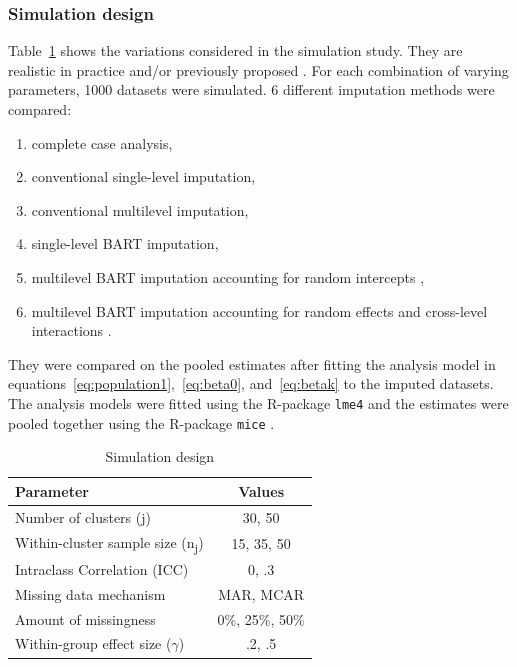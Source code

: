 \documentclass[10pt, a4paper, titlepage]{article}
\begin{document}
\subsubsection{Simulation design} 
Table~\ref{tab:simulationparameters} shows the variations considered in the simulation study. They are realistic in practice and/or previously proposed \citep{gulliford1999, murray2003, hox2017, grund2018, enders2018a, enders2020}. For each combination of varying parameters, 1000 datasets were simulated. 6 different imputation methods were compared: 
\begin{enumerate}
    \item complete case analysis,
    \item conventional single-level imputation,
    \item conventional multilevel imputation,
    \item single-level BART imputation,
    \item multilevel BART imputation accounting for random intercepts \citep{chen2020, wagner2020, tan2016, wundervald2022},
    \item multilevel BART imputation accounting for random effects and cross-level interactions \citep{dorie2022}.
\end{enumerate} They were compared on the pooled estimates after fitting the analysis model in equations~\ref{eq:population1},~\ref{eq:beta0}, and~\ref{eq:betak} to the imputed datasets. The analysis models were fitted using the R-package \texttt{lme4} \citep{bates2015} and the estimates were pooled together using the R-package \texttt{mice} \citep{buuren2011}.
\begin{table}
\centering
\caption{Simulation design}
\label{tab:simulationparameters}
\begin{tabular}{l|c}
        \textbf{Parameter}                                  & \textbf{Values} \\ \hline
        Number of clusters (j)                              & 30, 50          \\
        Within-cluster sample size (n\textsubscript{j})     & 15, 35, 50   \\
        Intraclass Correlation (ICC)                        & 0, .3  \\
        Missing data mechanism                              & MAR, MCAR       \\
        Amount of missingness                               & 0\%, 25\%, 50\% \\
        Within-group effect size ($\gamma$)                 & .2, .5
\end{tabular}
\end{table} 
\end{document}
